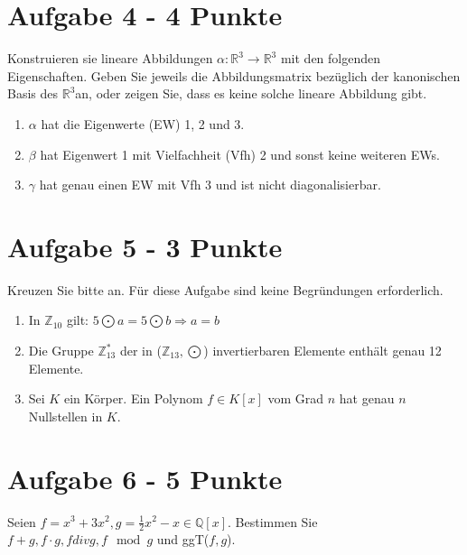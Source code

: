\section*{Aufgabe 4 - 4 Punkte}
Konstruieren sie lineare Abbildungen $\alpha: \mathbb{R}^3 \rightarrow \mathbb{R}^3$ mit den folgenden Eigenschaften.
Geben Sie jeweils die Abbildungsmatrix bezüglich der kanonischen Basis des $\mathbb{R}^3$an, oder zeigen Sie, dass es keine solche lineare Abbildung gibt.
  \begin{enumerate}[label=\alph*)]
    \item $\alpha$ hat die Eigenwerte (EW) 1, 2 und 3.
    \item $\beta$ hat Eigenwert 1 mit Vielfachheit (Vfh) 2 und sonst keine weiteren EWs.
    \item $\gamma$ hat genau einen EW mit Vfh 3 und ist nicht diagonalisierbar.
  \end{enumerate}
\section*{Aufgabe 5 - 3 Punkte}
 Kreuzen Sie bitte an. Für diese Aufgabe sind keine Begründungen erforderlich.
   \begin{enumerate}[label=\alph*)]
    \item In $\mathbb{Z}_{10}$ gilt: $5 \bigodot a = 5 \bigodot b \Rightarrow a = b$
    \item Die Gruppe $\mathbb{Z}_{13}^{*}$ der in ($\mathbb{Z}_{13}, \bigodot$) invertierbaren Elemente enthält genau 12 Elemente.
    \item Sei $K$ ein Körper. Ein Polynom $f \in K[x]$ vom Grad $n$ hat genau $n$ Nullstellen in $K$.
  \end{enumerate}
\section*{Aufgabe 6 - 5 Punkte}
Seien $f = x^3 + 3x^2 , g = \frac{1}{2}x^2 - x \in \mathbb{Q} [x]$. Bestimmen Sie $f+g, f\cdot g, f div g, f \mod g$ und ggT($f,g$).

